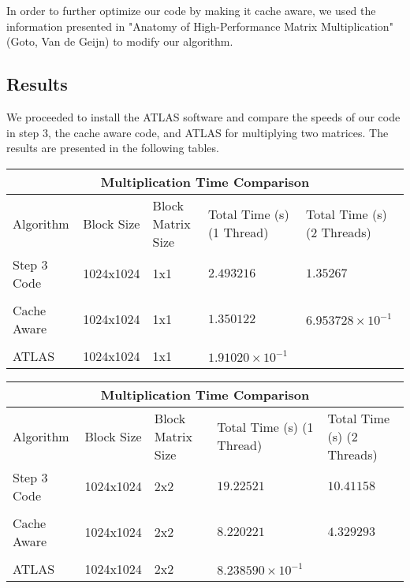 \documentclass[12pt]{article}
\newcommand{\0}{\mathbf{0}}
\begin{document}
	In order to further optimize our code by making it cache aware, we used the information presented in "Anatomy of High-Performance Matrix Multiplication" (Goto, Van de Geijn)\cite{goto} to modify our algorithm. \\
	
	\subsection{Results}
	We proceeded to install the ATLAS software and compare the speeds of our code in step 3, the cache aware code, and ATLAS for multiplying two matrices. The results are presented in the following tables. \\
	
	
	
	\begin{center}
		
		\begin{tabular}{ |p{2cm}| |p{2cm}| |p{2cm}||p{3cm}||p{3cm}|}
			\hline
			\multicolumn{5}{|c|}{Multiplication Time Comparison } \\
			\hline
			Algorithm& Block Size &Block Matrix Size & Total Time (s) (1 Thread)& Total Time (s) (2 Threads)\\
			\hline
			Step 3 Code & 1024x1024 &  1x1& $2.493216$  & $1.35267$    \\
			&  &  & & \\
			
			Cache Aware & 1024x1024& 1x1 &  $1.350122$ & $6.953728\times10^{-1}$   \\ 
			
			& & & & \\
			
			ATLAS & 1024x1024 & 1x1 & $1.91020\times10^{-1}$&  \\
			
			
			\hline
		\end{tabular}
		
	\end{center}
	
	
	\begin{center}
		
		\begin{tabular}{ |p{2cm}| |p{2cm}| |p{2cm}||p{3cm}||p{3cm}|}
			\hline
			\multicolumn{5}{|c|}{Multiplication Time Comparison } \\
			\hline
			Algorithm& Block Size &Block Matrix Size & Total Time (s) (1 Thread)& Total Time (s) (2 Threads)\\
			\hline
			Step 3 Code & 1024x1024 &  2x2& $19.22521$  & $10.41158$    \\
			&  &  & & \\
			
			Cache Aware & 1024x1024& 2x2 &  $8.220221$ & $4.329293$   \\ 
			
			& & & & \\
			
			ATLAS & 1024x1024 & 2x2 & $8.238590\times10^{-1}$&  \\
			
			
			\hline
		\end{tabular}
		
	\end{center}
	
\end{document}
